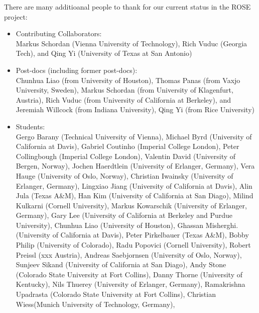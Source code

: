      There are many additioanal people to thank for our current status in 
the ROSE project:
\begin{itemize}
     \item Contributing Collaborators: \\
           Markus Schordan (Vienna University of Technology),
           Rich Vuduc (Georgia Tech), and
           Qing Yi (University of Texas at San Antonio)
     \item Post-docs (including former post-docs): \\
           Chunhua Liao (from University of Houston),
           Thomas Panas (from Vaxjo University, Sweden),
           Markus Schordan (from University of Klagenfurt, Austria),
           Rich Vuduc (from University of California at Berkeley), and
           Jeremiah Willcock (from Indiana University),
           Qing Yi (from Rice University)
     \item Students: \\
           Gergo Barany (Technical University of Vienna),
           Michael Byrd (University of California at Davis),
           Gabriel Coutinho (Imperial College London),
           Peter Collingbough (Imperial College London),
           Valentin David (University of Bergen, Norway),
           Jochen Haerdtlein (University of Erlanger, Germany),
           Vera Hauge (University of Oslo, Norway),
           Christian Iwainsky (University of Erlanger, Germany),
           Lingxiao Jiang (University of California at Davis),
           Alin Jula (Texas A\&M),
           Han Kim (University of California at San Diago),
           Milind Kulkarni (Cornell University),
           Markus Kowarschik (University of Erlanger, Germany),
           Gary Lee (University of California at Berkeley and Purdue University),
           Chunhua Liao (University of Houston),
           Ghassan Misherghi. (University of California at Davis),
           Peter Pirkelbauer (Texas A\&M),
           Bobby Philip (University of Colorado),
           Radu Popovici (Cornell University),
           Robert Preissl (xxx Austria),
           Andreas Saebjornsen (University of Oslo, Norway),
           Sunjeev Sikand (University of California at San Diago),
           Andy Stone (Colorado State University at Fort Collins),
           Danny Thorne (University of Kentucky), 
           Nils Thuerey (University of Erlanger, Germany), 
           Ramakrishna Upadrasta (Colorado State University at Fort Collins),
           Christian Wiess(Munich University of Technology, Germany), 

\end{itemize}
